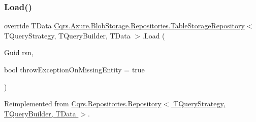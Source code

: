 \subsubsection{\texorpdfstring{Load()}{Load()}}
{\footnotesize\ttfamily override T\+Data \hyperlink{classCqrs_1_1Azure_1_1BlobStorage_1_1Repositories_1_1TableStorageRepository}{Cqrs.\+Azure.\+Blob\+Storage.\+Repositories.\+Table\+Storage\+Repository}$<$ T\+Query\+Strategy, T\+Query\+Builder, T\+Data $>$.Load (\begin{DoxyParamCaption}\item[{Guid}]{rsn,  }\item[{bool}]{throw\+Exception\+On\+Missing\+Entity = {\ttfamily true} }\end{DoxyParamCaption})\hspace{0.3cm}{\ttfamily [virtual]}}



Reimplemented from \hyperlink{classCqrs_1_1Repositories_1_1Repository_a444e9dfe4710be90940dbb6dec9d856f}{Cqrs.\+Repositories.\+Repository$<$ T\+Query\+Strategy, T\+Query\+Builder, T\+Data $>$}.

